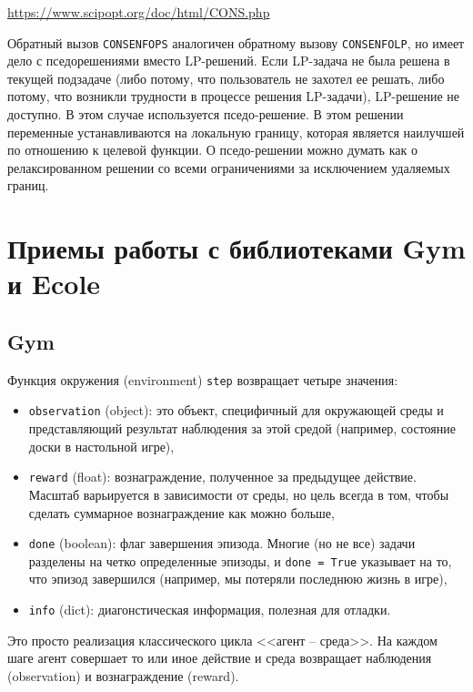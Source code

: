 \documentclass[%
	11pt,
	a4paper,
	utf8,
		]{article}
\begin{document}
\url{https://www.scipopt.org/doc/html/CONS.php}

Обратный вызов \texttt{CONSENFOPS} аналогичен обратному вызову \texttt{CONSENFOLP}, но имеет дело с пседорешениями вместо LP-решений. Если LP-задача не была решена в текущей подзадаче (либо потому, что пользователь не захотел ее решать, либо потому, что возникли трудности в процессе решения LP-задачи), LP-решение не доступно. В этом случае используется пседо-решение. В этом решении переменные устанавливаются на локальную границу, которая является наилучшей по отношению к целевой функции. О пседо-решении можно думать как о релаксированном решении со всеми ограничениями за исключением удаляемых границ.


\section{Приемы работы с библиотеками Gym и Ecole}

\subsection{Gym}

Функция окружения (environment) \texttt{step} возвращает четыре значения:
\begin{itemize}
	\item \verb|observation| (object):  это объект, специфичный для окружающей среды и представляющий результат наблюдения за этой средой (например, состояние доски в настольной игре),
	
	\item \verb|reward| (float): вознаграждение, полученное за предыдущее действие. Масштаб варьируется в зависимости от среды, но цель всегда в том, чтобы сделать суммарное вознаграждение как можно больше,
	
	\item \verb|done| (boolean): флаг завершения эпизода. Многие (но не все) задачи разделены на четко определенные эпизоды, и \texttt{done = True} указывает на то, что эпизод завершился (например, мы потеряли последнюю жизнь в игре),
	
	\item \verb|info| (dict): диагонстическая информация, полезная для отладки.
\end{itemize}

Это просто реализация классического цикла <<агент -- среда>>. На каждом шаге агент совершает то или иное действие и среда возвращает наблюдения (observation) и вознаграждение (reward).
\end{document}

